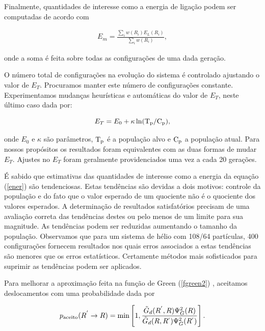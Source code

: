 \documentclass[12pt,twoside,a4paper]{report}
\begin{document}
Finalmente, quantidades de interesse como a energia de ligação podem ser 
computadas de acordo
com

\begin{eqnarray} \label{ener}
E_m = \frac{\sum_i w(R_i)E_L(R_i)}{\sum_i w(R_i)},
\end{eqnarray}

\noindent onde a soma é feita sobre todas as configurações de uma
dada geração.

O número total de configurações na evolução do sistema é controlado 
ajustando o valor de
$E_T$. Procuramos manter este número de configurações constante.
Experimentamos mudanças
heurísticas e
automáticas do valor de $E_T$, neste último caso dada por:

\begin{equation} \label{et}
E_T = E_0 + \kappa \ln ({\rm T_p}/{\rm C_p}),
\end{equation}

\noindent onde $E_0$ e $\kappa$ são parâmetros, ${\rm T_p}$ é a população
alvo e ${\rm C_p}$
a população atual. Para nossos propósitos os resultados foram
equivalentes com as
duas formas de mudar $E_T$. Ajustes no $E_T$ foram geralmente providenciados 
uma vez a cada 20
gerações.

É sabido\cite{cep79,rey82} que estimativas das quantidades de
interesse como a
energia da equação (\ref{ener}) são tendenciosas. Estas tendências são
devidas a dois motivos:
controle da população e do fato que o valor esperado de um quociente
não é o quociente dos
valores esperados. A determinação de
resultados satisfatórios precisam de uma
avaliação correta das tendências destes ou pelo menos de um limite para sua
magnitude. As tendências podem ser
reduzidas aumentando o tamanho da população. Observamos que
para um sistema de
hélio com 108/64 partículas, 400 configurações fornecem
resultados nos quais erros
associados a estas tendências são menores que os erros estatísticos.
Certamente métodos mais
sofisticados \cite{umr93,ass00} para suprimir as tendências podem ser
aplicados.

Para melhorar a aproximação feita na função de Green (\ref{fgreen2})
\cite{rey82,cep81}, aceitamos deslocamentos com uma probabilidade dada por

\begin{equation} \label{db}
p_{\rm aceito}(R^{'}\rightarrow R)={\rm
min}\left[1,\frac{\tilde{G}_d(R^{'},R)\Psi_G^2(R)}{\tilde{G}_d(R,R^{'})\Psi_G^2(
R^{'})}\right].
\end{equation}
\end{document}
